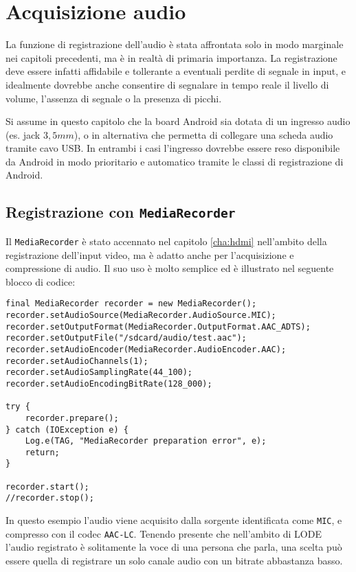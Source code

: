 \chapter{Acquisizione audio}
\label{cha:audio}

La funzione di registrazione dell'audio è stata affrontata solo in modo marginale nei capitoli precedenti, ma è in realtà di primaria importanza. La registrazione deve essere infatti affidabile e tollerante a eventuali perdite di segnale in input, e idealmente dovrebbe anche consentire di segnalare in tempo reale il livello di volume, l'assenza di segnale o la presenza di picchi.

Si assume in questo capitolo che la board Android sia dotata di un ingresso audio (es. jack $3,5mm$), o in alternativa che permetta di collegare una scheda audio tramite cavo USB. In entrambi i casi l'ingresso dovrebbe essere reso disponibile da Android in modo prioritario e automatico tramite le classi di registrazione di Android.

\section{Registrazione con \texttt{MediaRecorder}}
\label{sec:audio_mediarecord}

Il \texttt{MediaRecorder} è stato accennato nel capitolo \ref{cha:hdmi} nell'ambito della registrazione dell'input video, ma è adatto anche per l'acquisizione e compressione di audio. Il suo uso è molto semplice ed è illustrato nel seguente blocco di codice:

\begin{verbatim}
final MediaRecorder recorder = new MediaRecorder();
recorder.setAudioSource(MediaRecorder.AudioSource.MIC);
recorder.setOutputFormat(MediaRecorder.OutputFormat.AAC_ADTS);
recorder.setOutputFile("/sdcard/audio/test.aac");
recorder.setAudioEncoder(MediaRecorder.AudioEncoder.AAC);
recorder.setAudioChannels(1);
recorder.setAudioSamplingRate(44_100);
recorder.setAudioEncodingBitRate(128_000);

try {
    recorder.prepare();
} catch (IOException e) {
    Log.e(TAG, "MediaRecorder preparation error", e);
    return;
}

recorder.start();
//recorder.stop();
\end{verbatim}

In questo esempio l'audio viene acquisito dalla sorgente identificata come \texttt{MIC}, e compresso con il codec \texttt{AAC-LC}\footnotemark{}. Tenendo presente che nell'ambito di LODE l'audio registrato è solitamente la voce di una persona che parla, una scelta può essere quella di registrare un solo canale audio con un bitrate abbastanza basso.

